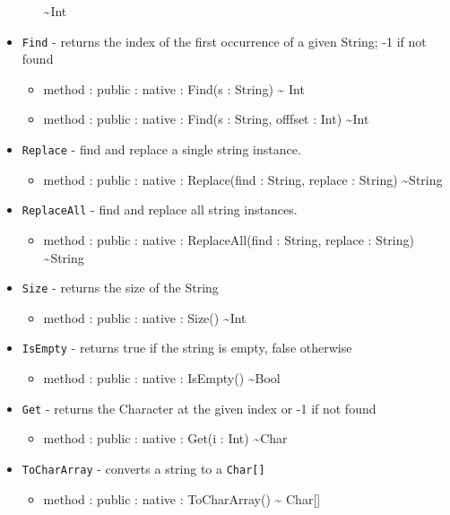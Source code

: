 \documentclass[11pt]{article}
\begin{document}
\begin{itemize}
\begin{itemize}
    \textasciitilde Int
  \end{itemize}
\item \texttt{Find} - returns the index of the first occurrence of a
  given String; -1 if not found
  \begin{itemize}
  \item method : public : native : Find(s : String) \textasciitilde
    Int
  \item method : public : native : Find(s : String, offfset : Int)
    \textasciitilde Int
  \end{itemize}
\item \texttt{Replace} - find and replace a single string instance.
  \begin{itemize}
  \item method : public : native : Replace(find : String, replace :
    String) \textasciitilde String
  \end{itemize}
\item \texttt{ReplaceAll} - find and replace all string instances.
  \begin{itemize}
  \item method : public : native : ReplaceAll(find : String, replace :
    String) \textasciitilde String
  \end{itemize}
\item \texttt{Size} - returns the size of the String
  \begin{itemize}
  \item method : public : native : Size() \textasciitilde Int
  \end{itemize}
\item \texttt{IsEmpty} - returns true if the string is empty, false
  otherwise
  \begin{itemize}
  \item method : public : native : IsEmpty() \textasciitilde Bool
  \end{itemize}
\item \texttt{Get} - returns the Character at the given index or -1 if
  not found
  \begin{itemize}
  \item method : public : native : Get(i : Int) \textasciitilde Char
  \end{itemize}
\item \texttt{ToCharArray} - converts a string to a \texttt{Char[]}
  \begin{itemize}
  \item method : public : native : ToCharArray() \textasciitilde
    Char[]
  \end{itemize}

\end{itemize}
\end{document}
